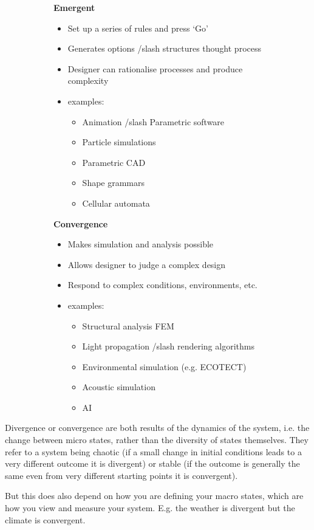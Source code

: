 \documentclass[a4paper, openany]{book}
\begin{document}
\begin{figure}[htbp]
  \centering
  \begin{subfigure}{0.49\textwidth}
    \centering
    \textbf{Emergent}
    \begin{itemize}
      \item Set up a series of rules and press `Go'
      \item Generates options /slash structures thought process
      \item Designer can rationalise processes and produce complexity
      \item examples:
      \begin{itemize}
        \item Animation /slash Parametric software
        \item Particle simulations
        \item Parametric CAD
        \item Shape grammars
        \item Cellular automata
      \end{itemize}
    \end{itemize}
  \end{subfigure}
  \begin{subfigure}{0.49\textwidth}
    \centering
    \textbf{Convergence}
    \begin{itemize}
      \item Makes simulation and analysis possible
      \item Allows designer to judge a complex design
      \item Respond to complex conditions, environments, etc.
      \item examples:
      \begin{itemize}
        \item Structural analysis FEM
        \item Light propagation /slash rendering algorithms
        \item Environmental simulation (e.g. ECOTECT)
        \item Acoustic simulation
        \item AI
      \end{itemize}
    \end{itemize}
  \end{subfigure}
\end{figure}

Divergence or convergence are both results of the dynamics of the system, i.e. the change between micro states, rather than the diversity of states themselves. They refer to a system being chaotic (if a small change in initial conditions leads to a very different outcome it is divergent) or stable (if the outcome is generally the same even from very different starting points it is convergent).

But this does also depend on how you are defining your macro states, which are how you view and measure your system. E.g. the weather is divergent but the climate is convergent.
\end{document}
